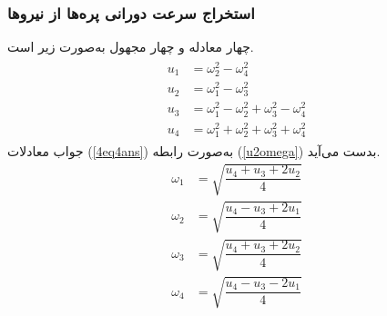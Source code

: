 \subsubsection{استخراج سرعت دورانی پره‌ها از نیروها}
چهار معادله و چهار مجهول به‌صورت زیر است.
\begin{align}\label{4eq4ans}
	\begin{split}
		u_1 &= \omega_2^2 - \omega_4^2\\
		u_2 &= \omega_1^2 - \omega_3^2\\
		u_3 &= \omega_1^2 - \omega_2^2  + \omega_3^2 - \omega_4^2\\
		u_4 &= \omega_1^2 + \omega_2^2  + \omega_3^2 + \omega_4^2
	\end{split}
\end{align}
جواب معادلات 
(\ref{4eq4ans})
به‌صورت رابطه 
(\ref{u2omega})
بدست می‌آید.
\begin{equation}\label{u2omega}
	\begin{split}
		\omega_1 &= \sqrt{\dfrac{u_4 + u_3 +2u_2}{4}}\\[1em]
		\omega_2 &= \sqrt{\dfrac{u_4 - u_3 +2u_1}{4}}\\[1em]
		\omega_3 &= \sqrt{\dfrac{u_4 + u_3 +2u_2}{4}}\\[1em]
		\omega_4 &= \sqrt{\dfrac{u_4 - u_3 -2u_1}{4}}
	\end{split}
\end{equation}
